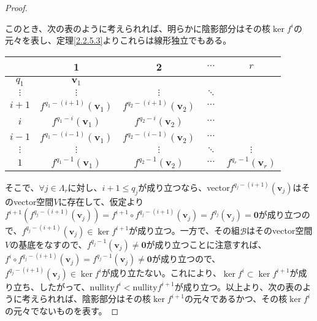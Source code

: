 \documentclass[dvipdfmx]{jsarticle}
\begin{document}
\begin{proof}
\begin{itemize}
\end{itemize}
このとき、次の表のように考えられれば、明らかに陰影部分はその核$\ker f^{i}$の元々を表し、定理\ref{2.2.5.3}よりこれらは線形独立でもある。
\begin{longtable}[c]{c|cccc}
&1&2&$\cdots $&$r$ \\
\hline
$q_{1}$ & $\mathbf{v}_{1}$ & & & \\
$\vdots$ & $\vdots$ & $\vdots$ & $\ddots$ & \\
$i + 1$ & $f^{q_{1} - (i + 1)}\left( \mathbf{v}_{1} \right)$ & $f^{q_{2} - (i + 1)}\left( \mathbf{v}_{2} \right)$ & $\cdots$ & \\
$i$ & \cellcolor{lightgray} $f^{q_{1} - i}\left( \mathbf{v}_{1} \right)$ & \cellcolor{lightgray} $f^{q_{2} - i}\left( \mathbf{v}_{2} \right)$ & \cellcolor{lightgray} $\cdots$ & \\
$i - 1$ & \cellcolor{lightgray} $f^{q_{1} - (i - 1)}\left( \mathbf{v}_{1} \right)$ & \cellcolor{lightgray} $f^{q_{2} - (i - 1)}\left( \mathbf{v}_{2} \right)$ & \cellcolor{lightgray} $\cdots$ & \\
$\vdots$ & \cellcolor{lightgray} $\vdots$ & \cellcolor{lightgray} $\vdots$ & \cellcolor{lightgray} $\ddots$ & \cellcolor{lightgray} $\vdots$ \\
$1$ & \cellcolor{lightgray} $f^{q_{1} - 1}\left( \mathbf{v}_{1} \right)$ & \cellcolor{lightgray} $f^{q_{2} - 1}\left( \mathbf{v}_{2} \right)$ & \cellcolor{lightgray} $\cdots$ & \cellcolor{lightgray} $f^{q_{r} - 1}\left( \mathbf{v}_{r} \right)$ \\
\end{longtable}
そこで、$\forall j \in \varLambda_{r}$に対し、$i + 1 \leq q_{j}$が成り立つなら、vector$f^{q_{j} - (i + 1)}\left( \mathbf{v}_{j} \right)$はそのvector空間$V$に存在して、仮定より$f^{i + 1}\left( f^{q_{j} - (i + 1)}\left( \mathbf{v}_{j} \right) \right) = f^{i + 1} \circ f^{q_{j} - (i + 1)}\left( \mathbf{v}_{j} \right) = f^{q_{j}}\left( \mathbf{v}_{j} \right) = \mathbf{0}$が成り立つので、$f^{q_{j} - (i + 1)}\left( \mathbf{v}_{j} \right) \in \ker f^{i + 1}$が成り立つ。一方で、その組$\mathcal{B}$はそのvector空間$V$の基底をなすので、$f^{q_{j} - 1}\left( \mathbf{v}_{j} \right) \neq \mathbf{0}$が成り立つことに注意すれば、$f^{i} \circ f^{q_{j} - (i + 1)}\left( \mathbf{v}_{j} \right) = f^{q_{j} - 1}\left( \mathbf{v}_{j} \right) \neq \mathbf{0}$が成り立つので、$f^{q_{j} - (i + 1)}\left( \mathbf{v}_{j} \right) \in \ker f^{i}$が成り立たない。これにより、$\ker f^{i} \subset \ker f^{i + 1}$が成り立ち、したがって、${\mathrm{nullity}}f^{i} < {\mathrm{nullity}}f^{i + 1}$が成り立つ。以上より、次の表のように考えられれば、陰影部分はその核$\ker f^{i + 1}$の元々であるかつ、その核$\ker f^{i}$の元々でないものを表す。

\end{proof}
\end{document}
